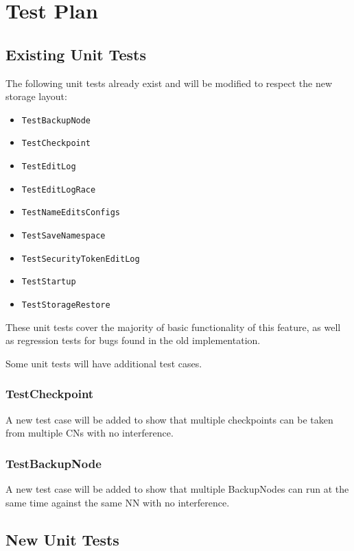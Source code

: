 \documentclass{article}
\begin{document}
\section{Test Plan}

\subsection{Existing Unit Tests}

The following unit tests already exist and will be modified to respect the new storage layout:
\begin{itemize}
\item {\tt TestBackupNode}
\item {\tt TestCheckpoint}
\item {\tt TestEditLog}
\item {\tt TestEditLogRace}
\item {\tt TestNameEditsConfigs}
\item {\tt TestSaveNamespace}
\item {\tt TestSecurityTokenEditLog}
\item {\tt TestStartup}
\item {\tt TestStorageRestore}
\end{itemize}

These unit tests cover the majority of basic functionality of this feature, as well as regression tests for bugs found in the old implementation.

Some unit tests will have additional test cases.

\subsubsection{TestCheckpoint}

A new test case will be added to show that multiple checkpoints can be taken from multiple CNs with no interference.

\subsubsection{TestBackupNode}

A new test case will be added to show that multiple BackupNodes can run at the same time against the same NN with no interference.

\subsection{New Unit Tests}
\end{document}
